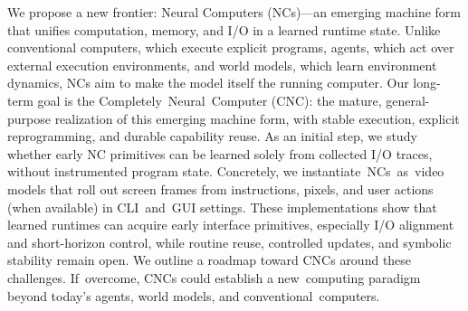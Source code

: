 

We propose a new frontier: Neural Computers (NCs)—an emerging machine form that unifies computation, memory, and I/O in a learned runtime state. Unlike conventional computers, which execute explicit programs, agents, which act over external execution environments, and world models, which learn environment dynamics, NCs aim to make the model itself the running computer.
Our long-term goal is the Completely~Neural~Computer (CNC): the mature, general-purpose realization of this emerging machine form, with stable execution, explicit reprogramming, and durable capability reuse. As an initial step, we study whether early NC primitives can be learned solely from collected I/O traces, without instrumented program state. Concretely, we instantiate~NCs~as~video models that roll out screen frames from instructions, pixels, and user actions (when available) in CLI~and~GUI settings.
These implementations show that learned runtimes can acquire early interface primitives, especially I/O alignment and short-horizon control, while routine reuse, controlled updates, and symbolic stability remain open. We outline a roadmap toward CNCs around these challenges. If~overcome, CNCs could establish a new~computing paradigm beyond today’s agents, world models, and conventional~computers.
